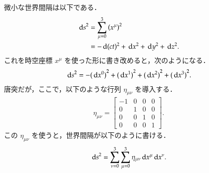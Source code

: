     微小な世界間隔は以下である．
    \begin{align*}
        {\,\mathrm{d}s}^{2} &= \sum_{\mu=0}^{3} \left({{x}^{\mu}}\right)^{2} \\
                    &= -\,\mathrm{d} (ct)^{2} + \,\mathrm{d} x^{2} + \,\mathrm{d} y^{2} + \,\mathrm{d} z^{2}.
    \end{align*}
    これを時空座標 $x^{\mu}$ を使った形に書き改めると，次のようになる．
    \begin{align}
        {\,\mathrm{d}s}^{2} = - {(\,\mathrm{d} x^{0})}^{2} + {(\,\mathrm{d} x^{1})}^{2} + {(\,\mathrm{d} x^{2})}^{2} + {(\,\mathrm{d} x^{3})}^{2}.
    \end{align}
    唐突だが，ここで，以下のような行列 $\eta_{\mu\nu}$ を導入する．
    \begin{align}
        \eta_{\mu\nu} =
            \begin{bmatrix}
                -1 & 0 & 0 & 0 \\
                 0 & 1 & 0 & 0 \\
                 0 & 0 & 1 & 0 \\
                 0 & 0 & 0 & 1
            \end{bmatrix}.
    \end{align}
    この $\eta_{\mu\nu}$ を使うと，世界間隔が以下のように書ける．
    \begin{align}
        {\,\mathrm{d}s}^{2} = \sum_{\nu=0}^{3} \sum_{\mu=0}^{3} \eta_{\mu\nu} \,\mathrm{d} x^{\mu} \,\mathrm{d} x^{\nu}.
    \end{align}

